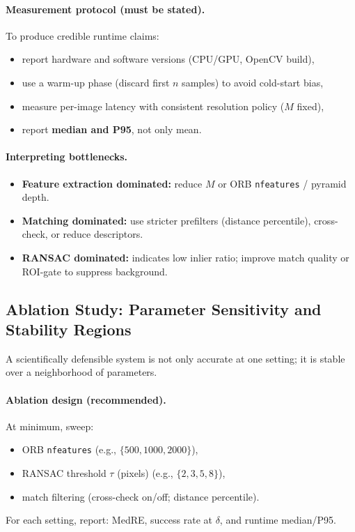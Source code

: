 \paragraph{Measurement protocol (must be stated).}
To produce credible runtime claims:
\begin{itemize}
  \item report hardware and software versions (CPU/GPU, OpenCV build),
  \item use a warm-up phase (discard first $n$ samples) to avoid cold-start bias,
  \item measure per-image latency with consistent resolution policy ($M$ fixed),
  \item report \textbf{median and P95}, not only mean.
\end{itemize}

\paragraph{Interpreting bottlenecks.}
\begin{itemize}
  \item \textbf{Feature extraction dominated:} reduce $M$ or ORB \texttt{nfeatures} / pyramid depth.
  \item \textbf{Matching dominated:} use stricter prefilters (distance percentile), cross-check, or reduce descriptors.
  \item \textbf{RANSAC dominated:} indicates low inlier ratio; improve match quality or ROI-gate to suppress background.
\end{itemize}

\subsection{Ablation Study: Parameter Sensitivity and Stability Regions}
A scientifically defensible system is not only accurate at one setting; it is stable over a neighborhood of parameters.


\paragraph{Ablation design (recommended).}
At minimum, sweep:
\begin{itemize}
  \item ORB \texttt{nfeatures} (e.g., $\{500,1000,2000\}$),
  \item RANSAC threshold $\tau$ (pixels) (e.g., $\{2,3,5,8\}$),
  \item match filtering (cross-check on/off; distance percentile).
\end{itemize}
For each setting, report: MedRE, success rate at $\delta$, and runtime median/P95.

